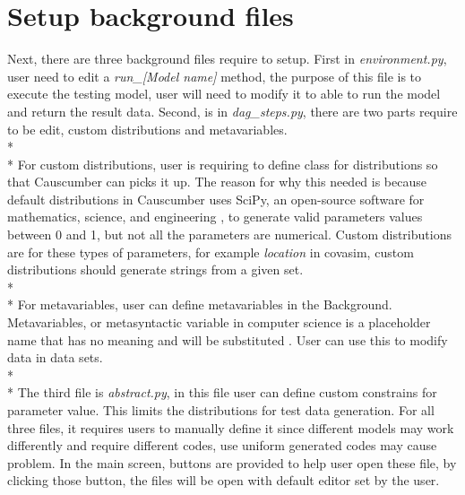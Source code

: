 \section{Setup background files}
Next, there are three background files require to setup. First in \textsl{environment.py}, user need to edit a \textsl{run\_[Model name]} method, the purpose of this file is to execute the testing model, user will need to modify it to able to run the model and return the result data. Second, is in \textsl{dag\_steps.py}, there are two parts require to be edit, custom distributions and metavariables. \\*\\*
For custom distributions, user is requiring to define class for distributions so that Causcumber can picks it up. The reason for why this needed is because default distributions in Causcumber uses SciPy, an open-source software for mathematics, science, and engineering \cite{Reference22}, to generate valid parameters values between 0 and 1, but not all the parameters are numerical. Custom distributions are for these types of parameters, for example \textsl{location} in covasim, custom distributions should generate strings from a given set.\\*\\*
For metavariables, user can define metavariables in the Background. Metavariables, or metasyntactic variable in computer science is a placeholder name that has no meaning and will be substituted \cite{Reference23}. User can use this to modify data in data sets.\\*\\*
The third file is \textsl{abstract.py}, in this file user can define custom constrains for parameter value. This limits the distributions for test data generation. For all three files, it requires users to manually define it since different models may work differently and require different codes, use uniform generated codes may cause problem. In the main screen, buttons are provided to help user open these file, by clicking those button, the files will be open with default editor set by the user.

